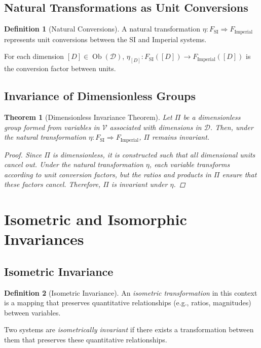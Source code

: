 \documentclass{article}
\newtheorem{theorem}{Theorem}[section]
\theoremstyle{definition}
\newtheorem{definition}{Definition}[section]
\theoremstyle{remark}
\begin{document}
	\subsection{Natural Transformations as Unit Conversions}
	
	\begin{definition}[Natural Conversions]
		A natural transformation $\eta: F_{\text{SI}} \Rightarrow F_{\text{Imperial}}$ represents unit conversions between the SI and Imperial systems.
		
		For each dimension $[D] \in \operatorname{Ob}(\mathcal{D})$, $\eta_{[D]}: F_{\text{SI}}([D]) \rightarrow F_{\text{Imperial}}([D])$ is the conversion factor between units.
	\end{definition}
	
	\subsection{Invariance of Dimensionless Groups}
	
	\begin{theorem}[Dimensionless Invariance Theorem]
		Let $\Pi$ be a dimensionless group formed from variables in $\mathcal{V}$ associated with dimensions in $\mathcal{D}$. Then, under the natural transformation $\eta: F_{\text{SI}} \Rightarrow F_{\text{Imperial}}$, $\Pi$ remains invariant.
		
		\begin{proof}
			Since $\Pi$ is dimensionless, it is constructed such that all dimensional units cancel out. Under the natural transformation $\eta$, each variable transforms according to unit conversion factors, but the ratios and products in $\Pi$ ensure that these factors cancel. Therefore, $\Pi$ is invariant under $\eta$.
		\end{proof}
	\end{theorem}
	
	\section{Isometric and Isomorphic Invariances}
	
	\subsection{Isometric Invariance}
	
	\begin{definition}[Isometric Invariance]
		An \emph{isometric transformation} in this context is a mapping that preserves quantitative relationships (e.g., ratios, magnitudes) between variables.
		
		Two systems are \emph{isometrically invariant} if there exists a transformation between them that preserves these quantitative relationships.
	\end{definition}
	
\end{document}
